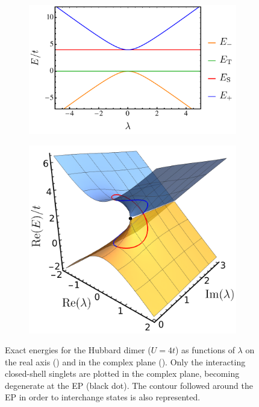 \documentclass[aps,prb,reprint,noshowkeys,superscriptaddress]{revtex4-1}
\newcommand{\titou}[1]{\textcolor{red}{#1}}
\begin{document}
\begin{figure}[t]
	\begin{subfigure}{0.49\textwidth}
	\includegraphics[height=0.65\textwidth]{fig1a}
	\subcaption{\titou{Real axis} \label{subfig:FCI_real}}
    \end{subfigure}
	\begin{subfigure}{0.49\textwidth}
	\includegraphics[height=0.65\textwidth]{fig1b}
	\subcaption{\titou{Complex plane} \label{subfig:FCI_cplx}}
    \end{subfigure}
	\caption{%
	Exact energies for the Hubbard dimer ($U=4t$) as functions of $\lambda$ on the real axis () and in the complex plane ().
    Only the interacting closed-shell singlets are plotted in the complex plane, becoming degenerate at the EP (black dot).
    The contour followed around the EP in order to interchange states is also represented.
	\label{fig:FCI}}
\end{figure}
\end{document}
